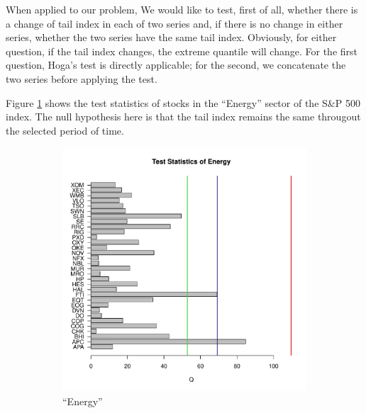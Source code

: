 \documentclass{article}
\begin{document}
When applied to our problem, We would like to test, first of all,
whether there is a change of tail index in each of two 
series and, if there is no change in either series, whether the two
series have the same tail index. Obviously, for either question, if
the tail index changes, the extreme quantile will change.
For the first question, Hoga's test is directly applicable; for the
second, we concatenate the two series before applying the
test.

Figure \ref{fig:Hoga_Energy_Single} shows the test statistics of
stocks in the ``Energy'' sector of the S\&P 500
index. The null hypothesis here is that the tail index remains the
same througout the selected period of time.
\begin{figure}[htb!]
  \begin{subfigure}[b]{0.5\linewidth}
    \includegraphics[width=\textwidth]{Hoga_Energy_Single.pdf}
    \caption{``Energy''}
    \label{fig:Hoga_Energy_Single}
  \end{subfigure}
  \begin{subfigure}[b]{0.5\linewidth}

\end{subfigure}
\end{figure}
\end{document}
